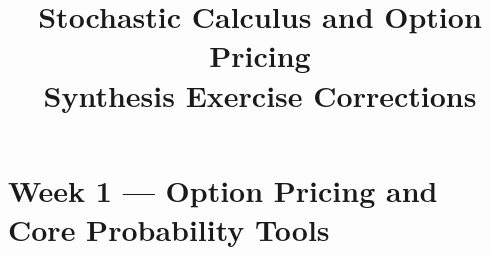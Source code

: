 \documentclass[11pt]{article}
\title{Stochastic Calculus and Option Pricing\\Synthesis Exercise Corrections}
\author{}
\date{}
\newcommand{\1}{\mathbf{1}}
\let\synthmaketitle\maketitle
\begin{document}
\synthmaketitle
\vspace{-1.2em}

\section{Week 1 --- Option Pricing and Core Probability Tools}

\let\maketitle\relax



\end{document}
